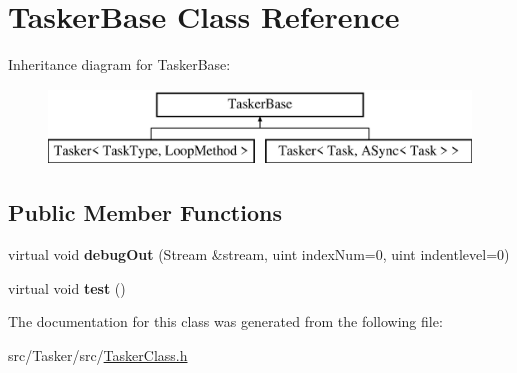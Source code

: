 \hypertarget{class_tasker_base}{}\section{Tasker\+Base Class Reference}
\label{class_tasker_base}
Inheritance diagram for Tasker\+Base\+:\begin{figure}[H]
\begin{center}
\leavevmode
\includegraphics[height=2.000000cm]{class_tasker_base}
\end{center}
\end{figure}
\subsection*{Public Member Functions}
\begin{DoxyCompactItemize}
\item 
\mbox{\label{class_tasker_base_a7bf4774e6d8cf33fb5ce54e5ff6abfac}} 
virtual void {\bfseries debug\+Out} (Stream \&stream, uint index\+Num=0, uint indentlevel=0)
\item 
\mbox{\label{class_tasker_base_a9da41046397c54692d9067203f761923}} 
virtual void {\bfseries test} ()
\end{DoxyCompactItemize}


The documentation for this class was generated from the following file\+:\begin{DoxyCompactItemize}
\item 
src/\+Tasker/src/\hyperlink{_tasker_class_8h}{Tasker\+Class.\+h}\end{DoxyCompactItemize}
